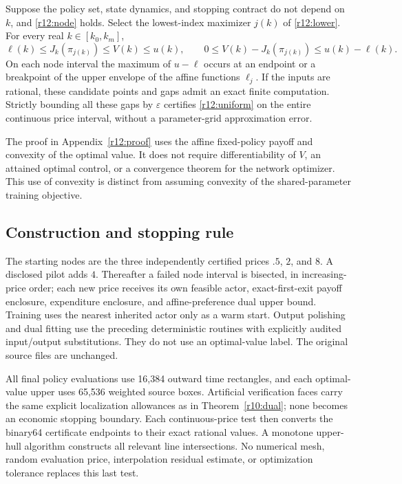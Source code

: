 \begin{theorem}\label{r12:envelope}
Suppose the policy set, state dynamics, and stopping contract do not depend on $k$, and \eqref{r12:node} holds. Select the lowest-index maximizer $j(k)$ of \eqref{r12:lower}. For every real $k\in[k_0,k_m]$,
\begin{equation}
 \ell(k)\leq J_k(\pi_{j(k)})\leq V(k)\leq u(k),
 \qquad 0\leq V(k)-J_k(\pi_{j(k)})\leq u(k)-\ell(k).
 \label{r12:uniform}
\end{equation}
On each node interval the maximum of $u-\ell$ occurs at an endpoint or a breakpoint of the upper envelope of the affine functions $\ell_j$. If the inputs are rational, these candidate points and gaps admit an exact finite computation. Strictly bounding all these gaps by $\varepsilon$ certifies \eqref{r12:uniform} on the entire continuous price interval, without a parameter-grid approximation error.
\end{theorem}
The proof in Appendix~\ref{r12:proof} uses the affine fixed-policy payoff and convexity of the optimal value. It does not require differentiability of $V$, an attained optimal control, or a convergence theorem for the network optimizer. This use of convexity is distinct from assuming convexity of the shared-parameter training objective.

\subsection{Construction and stopping rule}
The starting nodes are the three independently certified prices $.5$, $2$, and $8$. A disclosed pilot adds $4$. Thereafter a failed node interval is bisected, in increasing-price order; each new price receives its own feasible actor, exact-first-exit payoff enclosure, expenditure enclosure, and affine-preference dual upper bound. Training uses the nearest inherited actor only as a warm start. Output polishing and dual fitting use the preceding deterministic routines with explicitly audited input/output substitutions. They do not use an optimal-value label. The original source files are unchanged.

All final policy evaluations use 16,384 outward time rectangles, and each optimal-value upper uses 65,536 weighted source boxes. Artificial verification faces carry the same explicit localization allowances as in Theorem~\ref{r10:dual}; none becomes an economic stopping boundary. Each continuous-price test then converts the binary64 certificate endpoints to their exact rational values. A monotone upper-hull algorithm constructs all relevant line intersections. No numerical mesh, random evaluation price, interpolation residual estimate, or optimization tolerance replaces this last test.

